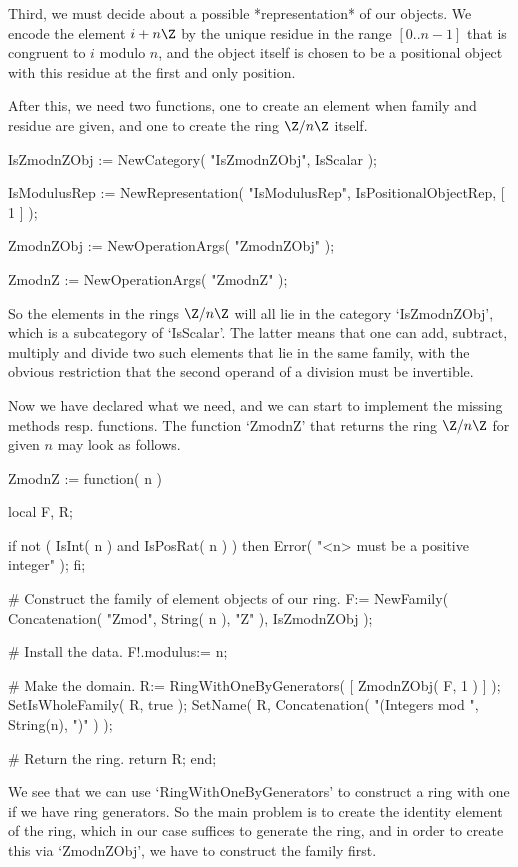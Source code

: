 Third, we must decide about a possible *representation* of our objects.
We encode the element $i + n\Z$ by the unique residue in the range
$[ 0 .. n-1 ]$ that is congruent to $i$ modulo $n$,
and the object itself is chosen to be a positional object with this
residue at the first and only position.

After this, we need two functions,
one to create an element when family and residue are given,
and one to create the ring $\Z/n\Z$ itself.

\beginexample
    IsZmodnZObj := NewCategory( "IsZmodnZObj", IsScalar );

    IsModulusRep := NewRepresentation( "IsModulusRep",
        IsPositionalObjectRep,
        [ 1 ] );

    ZmodnZObj := NewOperationArgs( "ZmodnZObj" );

    ZmodnZ := NewOperationArgs( "ZmodnZ" );
\endexample

So the elements in the rings $\Z/n\Z$ will all lie in the category
`IsZmodnZObj',
which is a subcategory of `IsScalar'.
The latter means that one can add, subtract, multiply and divide
two such elements that lie in the same family,
with the obvious restriction that the second operand of a division
must be invertible.

Now we have declared what we need,
and we can start to implement the missing methods resp. functions.
The function `ZmodnZ' that returns the ring $\Z/n\Z$ for given $n$
may look as follows.

\beginexample
    ZmodnZ := function( n )

        local F, R;

        if not ( IsInt( n ) and IsPosRat( n ) ) then
          Error( "<n> must be a positive integer" );
        fi;

        # Construct the family of element objects of our ring.
        F:= NewFamily( Concatenation( "Zmod", String( n ), "Z" ),
                       IsZmodnZObj );

        # Install the data.
        F!.modulus:= n;

        # Make the domain.
        R:= RingWithOneByGenerators( [ ZmodnZObj( F, 1 ) ] );
        SetIsWholeFamily( R, true );
        SetName( R, Concatenation( "(Integers mod ", String(n), ")" ) );

        # Return the ring.
        return R;
    end;
\endexample

We see that we can use `RingWithOneByGenerators' to construct a ring
with one if we have ring generators.
So the main problem is to create the identity element of the ring,
which in our case suffices to generate the ring,
and in order to create this via `ZmodnZObj',
we have to construct the family first.

